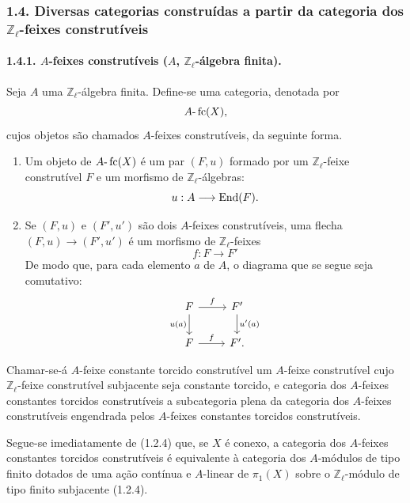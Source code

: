 \subsubsection*{1.4. Diversas categorias construídas a partir da categoria dos \(\mathbb Z_\ell\)-feixes construtíveis}

\paragraph{1.4.1. \(A\)-feixes construtíveis (\(A\), \(\mathbb Z_\ell\)-álgebra finita).}
Seja \(A\) uma \(\mathbb Z_\ell\)-álgebra finita. Define-se uma categoria, denotada por
\[
A\text{-}\operatorname{fc}(X),
\]
cujos objetos são chamados \(A\)-feixes construtíveis, da seguinte forma.

\begin{enumerate}[label=(\roman*)]
\item Um objeto de \(A\text{-}\operatorname{fc}(X)\) é um par \((F,u)\) formado por um \(\mathbb Z_\ell\)-feixe construtível \(F\) e um morfismo de \(\mathbb Z_\ell\)-álgebras:
\[
u:A\longrightarrow \operatorname{End}(F).
\]
\item Se \((F,u)\) e \((F',u')\) são dois \(A\)-feixes construtíveis, uma flecha \((F,u)\to(F',u')\) é um morfismo de \(\mathbb Z_\ell\)-feixes
\[
f:F\longrightarrow F'
\]
De modo que, para cada elemento \(a\) de \(A\), o diagrama que se segue seja comutativo:
\[
\begin{tikzcd}
F \arrow[r,"f"] \arrow[d,"u(a)"'] & F' \arrow[d,"u'(a)"]\\
F \arrow[r,"f"] & F'.
\end{tikzcd}
\]
\end{enumerate}

Chamar-se-á \(A\)-feixe constante torcido construtível um \(A\)-feixe construtível cujo \(\mathbb Z_\ell\)-feixe construtível subjacente seja constante torcido, e categoria dos \(A\)-feixes constantes torcidos construtíveis a subcategoria plena da categoria dos \(A\)-feixes construtíveis engendrada pelos \(A\)-feixes constantes torcidos construtíveis.

Segue-se imediatamente de (1.2.4) que, se \(X\) é conexo, a categoria dos \(A\)-feixes constantes torcidos construtíveis é equivalente à categoria dos \(A\)-módulos de tipo finito dotados de uma ação contínua e \(A\)-linear de \(\pi_1(X)\) sobre o \(\mathbb Z_\ell\)-módulo de tipo finito subjacente (1.2.4).
